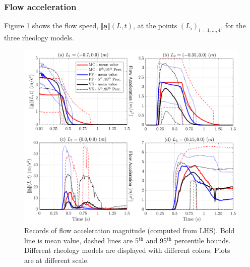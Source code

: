 \documentclass{article}
\begin{document}
\subsubsection{Flow acceleration}
Figure \ref{fig:Ramp-AccL} shows the flow speed, $\Vert \underline{\mathbf{a}} \Vert(L,t)$, at the points $(L_i)_{i=1,\dots,4}$, for the three rheology models.
\begin{figure}[H]
         \centering
        \includegraphics[width=1\textwidth]{InclinedPlane/LocalMeasurments/Acceleration.png}
        \caption{Records of flow acceleration magnitude (computed from LHS). Bold line is mean value, dashed lines are 5$^{\mathrm{th}}$ and 95$^{\mathrm{th}}$ percentile bounds. Different rheology models are displayed with different colors. Plots are at different scale.}
        \label{fig:Ramp-AccL}
\end{figure}
\end{document}
